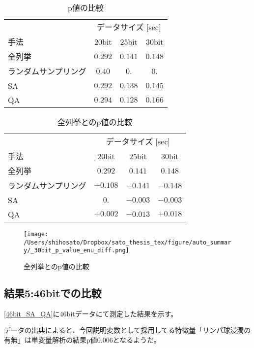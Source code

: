 \documentclass[12pt, dvipdfmx]{jmaster}
\theoremstyle{definition}
\begin{document}
\begin{table}[hbtp]
\caption{p値の比較}
\label{tb:p_value}
\centering
\begin{tabular}{lccc}
  \hline
  & \multicolumn{3}{c}{データサイズ [sec]}\\手法& 20bit & 25bit & 30bit \\
		\hline\hline
		全列挙 & $0.292$ & $0.141$ & $0.148$ \\
		ランダムサンプリング & $0.40$ & $0.$ & $0.$ \\
		SA & $0.292$ & $0.138$ & $0.145$ \\
		QA & $0.294$ & $0.128$ & $0.166$ \\
		\hline
	\end{tabular}
\end{table}

\begin{table}[hbtp]
	\caption{全列挙とのp値の比較}
	\label{tb:enu_p_value}
	\centering
	\begin{tabular}{lccc}
		\hline
		& \multicolumn{3}{c}{データサイズ [sec]}\\
		手法& 20bit & 25bit & 30bit \\
		全列挙 & $0.292$ & $0.141$ & $0.148$ \\
		\hline\hline
		ランダムサンプリング & $+0.108$ & $-0.141$ & $-0.148$ \\
		SA & $0.$ & $-0.003$ & $-0.003$ \\
		QA & $+0.002$ & $-0.013$ & $+0.018$ \\
		\hline
	\end{tabular}
\end{table}

\begin{figure}
	\begin{center}
		\texttt{[image: /Users/shihosato/Dropbox/sato\_thesis\_tex/figure/auto\_summary/\_30bit\_p\_value\_enu\_diff.png]}
	\end{center}
	\caption{全列挙とのp値の比較}
	\label{fig:enu_p_value}
\end{figure}

\subsection{結果5:46bitでの比較}
\ref{46bit_SA_QA}に46bitデータにて測定した結果を示す。

データの出典によると、今回説明変数として採用してる特徴量「リンパ球浸潤の有無」は単変量解析の結果p値0.006となるようだ\cite{jaffe1983osteosarcoma}。
\end{document}
